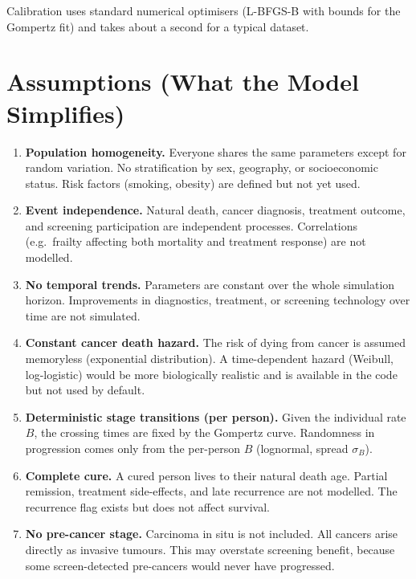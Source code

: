 \documentclass[12pt,a4paper]{article}
\begin{document}
Calibration uses standard numerical optimisers (L-BFGS-B with bounds for the Gompertz fit) and takes about a second for a typical dataset.

\section{Assumptions (What the Model Simplifies)}

\begin{enumerate}
    \item \textbf{Population homogeneity.} Everyone shares the same parameters except for random variation. No stratification by sex, geography, or socioeconomic status. Risk factors (smoking, obesity) are defined but not yet used.

    \item \textbf{Event independence.} Natural death, cancer diagnosis, treatment outcome, and screening participation are independent processes. Correlations (e.g.\ frailty affecting both mortality and treatment response) are not modelled.

    \item \textbf{No temporal trends.} Parameters are constant over the whole simulation horizon. Improvements in diagnostics, treatment, or screening technology over time are not simulated.

    \item \textbf{Constant cancer death hazard.} The risk of dying from cancer is assumed memoryless (exponential distribution). A time-dependent hazard (Weibull, log-logistic) would be more biologically realistic and is available in the code but not used by default.

    \item \textbf{Deterministic stage transitions (per person).} Given the individual rate $B$, the crossing times are fixed by the Gompertz curve. Randomness in progression comes only from the per-person $B$ (lognormal, spread $\sigma_B$).

    \item \textbf{Complete cure.} A cured person lives to their natural death age. Partial remission, treatment side-effects, and late recurrence are not modelled. The recurrence flag exists but does not affect survival.

    \item \textbf{No pre-cancer stage.} Carcinoma in situ is not included. All cancers arise directly as invasive tumours. This may overstate screening benefit, because some screen-detected pre-cancers would never have progressed.


\end{enumerate}
\end{document}
